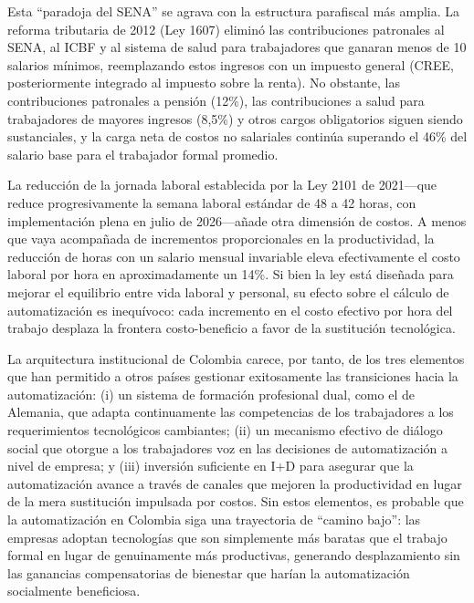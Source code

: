 \documentclass{article}
\begin{document}
Esta ``paradoja del SENA'' se agrava con la estructura parafiscal m\'as amplia. La reforma tributaria de 2012 (Ley 1607) elimin\'o las contribuciones patronales al SENA, al ICBF y al sistema de salud para trabajadores que ganaran menos de 10 salarios m\'inimos, reemplazando estos ingresos con un impuesto general (CREE, posteriormente integrado al impuesto sobre la renta). No obstante, las contribuciones patronales a pensi\'on (12\%), las contribuciones a salud para trabajadores de mayores ingresos (8,5\%) y otros cargos obligatorios siguen siendo sustanciales, y la carga neta de costos no salariales contin\'ua superando el 46\% del salario base para el trabajador formal promedio.

La reducci\'on de la jornada laboral establecida por la Ley 2101 de 2021---que reduce progresivamente la semana laboral est\'andar de 48 a 42 horas, con implementaci\'on plena en julio de 2026---a\~nade otra dimensi\'on de costos. A menos que vaya acompa\~nada de incrementos proporcionales en la productividad, la reducci\'on de horas con un salario mensual invariable eleva efectivamente el costo laboral por hora en aproximadamente un 14\%. Si bien la ley est\'a dise\~nada para mejorar el equilibrio entre vida laboral y personal, su efecto sobre el c\'alculo de automatizaci\'on es inequ\'ivoco: cada incremento en el costo efectivo por hora del trabajo desplaza la frontera costo-beneficio a favor de la sustituci\'on tecnol\'ogica.

La arquitectura institucional de Colombia carece, por tanto, de los tres elementos que han permitido a otros pa\'ises gestionar exitosamente las transiciones hacia la automatizaci\'on: (i) un sistema de formaci\'on profesional dual, como el de Alemania, que adapta continuamente las competencias de los trabajadores a los requerimientos tecnol\'ogicos cambiantes; (ii) un mecanismo efectivo de di\'alogo social que otorgue a los trabajadores voz en las decisiones de automatizaci\'on a nivel de empresa; y (iii) inversi\'on suficiente en I+D para asegurar que la automatizaci\'on avance a trav\'es de canales que mejoren la productividad en lugar de la mera sustituci\'on impulsada por costos. Sin estos elementos, es probable que la automatizaci\'on en Colombia siga una trayectoria de ``camino bajo'': las empresas adoptan tecnolog\'ias que son simplemente m\'as baratas que el trabajo formal en lugar de genuinamente m\'as productivas, generando desplazamiento sin las ganancias compensatorias de bienestar que har\'ian la automatizaci\'on socialmente beneficiosa.
\end{document}
